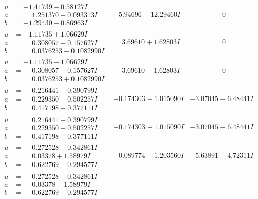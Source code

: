 \documentclass[1p]{elsarticle_modified}
\theoremstyle{definition}
\begin{document}
$$\begin{array}{c|c|c}
\begin{aligned}
u &= -1.41739 - 0.58127 I \\
a &= \phantom{-}1.251370 - 0.093313 I \\
b &= -1.29430 - 0.86963 I\end{aligned}
 & -5.94696 - 12.29460 I & \phantom{-0.000000 } 0 \\ \hline\begin{aligned}
u &= -1.11735 + 1.06629 I \\
a &= \phantom{-}0.308057 - 0.157627 I \\
b &= \phantom{-}0.0376253 - 0.1082990 I\end{aligned}
 & \phantom{-}3.69610 + 1.62803 I & \phantom{-0.000000 } 0 \\ \hline\begin{aligned}
u &= -1.11735 - 1.06629 I \\
a &= \phantom{-}0.308057 + 0.157627 I \\
b &= \phantom{-}0.0376253 + 0.1082990 I\end{aligned}
 & \phantom{-}3.69610 - 1.62803 I & \phantom{-0.000000 } 0 \\ \hline\begin{aligned}
u &= \phantom{-}0.216441 + 0.390799 I \\
a &= \phantom{-}0.229350 + 0.502257 I \\
b &= \phantom{-}0.417198 + 0.377111 I\end{aligned}
 & -0.174303 - 1.015090 I & -3.07045 + 6.48441 I \\ \hline\begin{aligned}
u &= \phantom{-}0.216441 - 0.390799 I \\
a &= \phantom{-}0.229350 - 0.502257 I \\
b &= \phantom{-}0.417198 - 0.377111 I\end{aligned}
 & -0.174303 + 1.015090 I & -3.07045 - 6.48441 I \\ \hline\begin{aligned}
u &= \phantom{-}0.272528 + 0.342861 I \\
a &= \phantom{-}0.03378 + 1.58979 I \\
b &= \phantom{-}0.622769 + 0.294577 I\end{aligned}
 & -0.089774 - 1.203560 I & -5.63891 + 4.72311 I \\ \hline\begin{aligned}
u &= \phantom{-}0.272528 - 0.342861 I \\
a &= \phantom{-}0.03378 - 1.58979 I \\
b &= \phantom{-}0.622769 - 0.294577 I\end{aligned}

\end{array}$$
\end{document}
